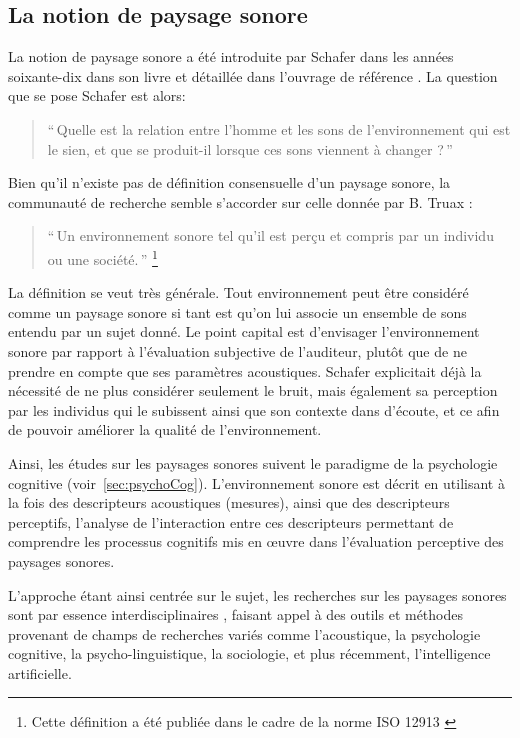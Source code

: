 \subsection{La notion de paysage sonore}

La notion de paysage sonore a été introduite par Schafer dans les années soixante-dix
dans son livre \citep{schafer1969new} et détaillée dans l'ouvrage de référence \citep{schafer1977tuning}. La question que se pose Schafer est alors:

\begin{quote}
``\,Quelle est la relation entre l'homme et les sons de l'environnement qui est le sien, et que se produit-il lorsque ces sons viennent à changer ?\,''
\end{quote}

Bien qu'il n'existe pas de définition consensuelle d'un paysage sonore, la communauté de recherche semble s'accorder \citep{niessen2010categories,aletta2016soundscape} sur celle donnée par B. Truax \citep{truax1978handbook}:

\begin{quote}
``\,Un environnement sonore tel qu'il est perçu et compris par un individu ou une société.\,'' \footnote{Cette définition a été publiée dans le cadre de la norme ISO 12913 \citep{iso12913}}
\end{quote}

La définition se veut très générale. Tout environnement peut être considéré comme un paysage sonore si tant est qu'on lui associe un ensemble de sons entendu par un sujet donné. Le point capital est d'envisager l’environnement sonore par rapport à l'évaluation subjective de l'auditeur, plutôt que de ne prendre en compte que ses paramètres acoustiques. Schafer explicitait déjà la nécessité de ne plus considérer seulement le bruit, mais également sa perception par les individus qui le subissent ainsi que son contexte dans d'écoute, et ce afin de pouvoir améliorer la qualité de l'environnement.

Ainsi, les études sur les paysages sonores suivent le paradigme de la psychologie cognitive \citep{dubois2006cognitive,maffiolo_caracterisation_1999} (voir~\ref{sec:psychoCog}). L'environnement sonore est décrit en utilisant à la fois des descripteurs acoustiques (mesures), ainsi que des descripteurs perceptifs, l'analyse de l'interaction entre ces descripteurs permettant de comprendre les processus cognitifs mis en œuvre dans l'évaluation perceptive des paysages sonores.

L'approche étant ainsi centrée sur le sujet, les recherches sur les paysages sonores sont par essence interdisciplinaires \citep{davies2013perception,aletta2016soundscape}, faisant appel à des outils et méthodes provenant de champs de recherches variés comme l'acoustique, la psychologie cognitive, la psycho-linguistique, la sociologie, et plus récemment, l’intelligence artificielle.

